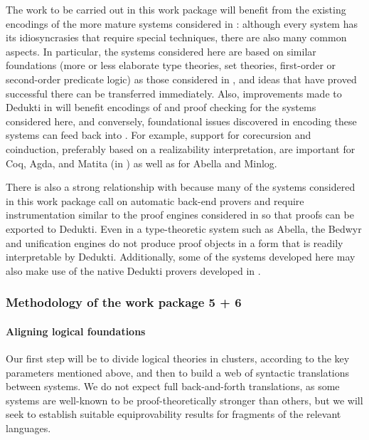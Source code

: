 The work to be carried out in this work package will benefit from the existing
encodings of the more mature systems considered in
:
although every system has its idiosyncrasies that require special techniques,
there are also many common aspects. In particular, the systems considered here
are based on similar foundations (more or less elaborate type theories, set
theories, first-order or second-order predicate logic) as those considered in
, and ideas that have proved successful there can be
transferred immediately. Also, improvements made to Dedukti in
 will benefit encodings of and proof checking for the
systems considered here, and conversely, foundational issues discovered in
encoding these systems can feed back into . For example,
support for corecursion and coinduction, preferably based on a realizability
interpretation, are important for Coq, Agda, and Matita (in
) as well as for Abella and Minlog.

There is also a strong relationship with  because many of the
systems considered in this work package call on automatic back-end provers and
require instrumentation similar to the proof engines considered in
 so that proofs can be exported to Dedukti. Even in a
type-theoretic system such as Abella, the Bedwyr and unification engines do not
produce proof objects in a form that is readily interpretable by Dedukti.
Additionally, some of the systems developed here may also make use of the native
Dedukti provers developed in .


\subsubsection{Methodology of the work package 5 + 6}

\paragraph{Aligning logical foundations}

Our first step will be to divide logical theories in clusters,
according to the key parameters mentioned above, and then to build a
web of syntactic translations between systems. We do not expect full
back-and-forth translations, as some systems are well-known to be
proof-theoretically stronger than others, but we will seek to
establish suitable equiprovability results for fragments of the
relevant languages.

